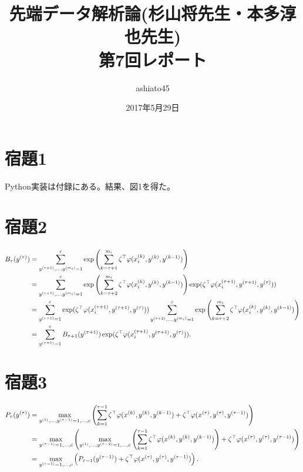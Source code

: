 \documentclass[9pt]{ltjsarticle}
\title{先端データ解析論(杉山将先生・本多淳也先生)\\第7回レポート}
\author{ashiato45}
\date{2017年5月29日}
\begin{document}
\maketitle

\section*{宿題1}
Python実装は付録にある。結果、図1を得た。


\section*{宿題2}
\begin{align}
 B_\tau(y^{(\tau)}) &=
 \sum_{y^{(\tau+1)},\dots,y^{(m_i)}=1}^c \exp\left(\sum_{k=\tau+1}^{m_i} \zeta^\top \varphi(x_i^{(k)},y^{(k)},y^{(k-1)})\right)\\
 & =
 \sum_{y^{(\tau+1)},\dots,y^{(m_i)}=1}^c \exp\left(\sum_{k=\tau+2}^{m_i} \zeta^\top \varphi(x_i^{(k)},y^{(k)},y^{(k-1)})\right)\exp(\zeta^\top \varphi(x_i^{(\tau+1)},y^{(\tau+1)},y^{(\tau)}))\\
 & =
 \sum_{y^{(\tau+1)}=1}^c \exp(\zeta^\top \varphi(x_i^{(\tau+1)},y^{(\tau+1)},y^{(\tau)})) \sum_{y^{(\tau+2)},\dots,y^{(m_i)}=1}^c \exp\left(\sum_{k=\tau+2}^{m_i} \zeta^\top \varphi(x_i^{(k)},y^{(k)},y^{(k-1)})\right)\\
 & =
 \sum_{y^{(\tau+1)}=1}^c B_{\tau+1}(y^{(\tau+1)})\exp(\zeta^\top \varphi(x_i^{(\tau+1)},y^{(\tau+1)},y^{(\tau)})).
\end{align}

\section*{宿題3}
\begin{align}
 P_\tau(y^{(\tau)})
 &=
 \max_{y^{(1)},\dots,y^{(\tau-1)}=1,\dots,c}\left(\sum_{k=1}^{\tau-1}\zeta^\top \varphi(x^{(k)},y^{(k)},y^{(k-1)}) + \zeta^\top \varphi(x^{(\tau)},y^{(\tau)},y^{(\tau-1)})\right)\\
 & =
\max_{y^{(\tau-1)}=1,\dots,c}\left( \max_{y^{(1)},\dots,y^{(\tau-2)}=1,\dots,c} \left(\sum_{k=1}^{\tau-1}\zeta^\top \varphi(x^{(k)},y^{(k)},y^{(k-1)})\right) + \zeta^\top \varphi(x^{(\tau)},y^{(\tau)},y^{(\tau-1)})\right)\\
 & =
\max_{y^{(\tau-1)}=1,\dots,c}\left( P_{\tau-1}(y^{(\tau-1)}) + \zeta^\top \varphi(x^{(\tau)},y^{(\tau)},y^{(\tau-1)})\right).
\end{align}
\end{document}
